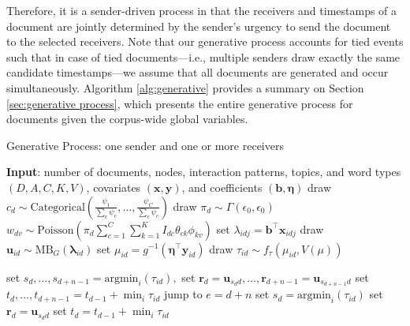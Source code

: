 \documentclass[ba]{imsart}
\def\spacingset#1{\renewcommand{\baselinestretch}%
	{#1}\small\normalsize} \spacingset{1}
\numberwithin{equation}{section}
\theoremstyle{plain}
\begin{document}
		Therefore, it is a sender-driven process in that the receivers and timestamps of a document are jointly determined by the sender's urgency to send the document to the selected receivers. Note that our generative process accounts for tied events such that in case of tied documents---i.e., multiple senders draw exactly the same candidate timestamps---we assume that all documents are generated and occur simultaneously. Algorithm \ref{alg:generative} provides a summary on Section \ref{sec:generative process}, which presents the entire generative process for documents given the corpus-wide global variables.
	\begin{algorithm}[!t]
		\spacingset{1}
		\SetAlgoLined
		\caption{Generative Process: one sender and one or more receivers}
	\begin{algorithmic}
		\STATE \textbf{Input}: number of documents, nodes, interaction patterns, topics, and word types $(D, A, C, K, V)$, covariates $(\boldsymbol{x}, \boldsymbol{y})$, and coefficients $(\boldsymbol{b}, \boldsymbol{\eta})$
		\vskip 0.1in
		\STATE	draw $c_d\sim \mbox{Categorical}(\frac{\psi_1}{\sum_c \psi_c},\ldots,\frac{\psi_C}{\sum_c\psi_c})$
		\STATE draw $\pi_{d}\sim \Gamma(\epsilon_0,\epsilon_0)$
		\STATE $w_{dv} \sim \mbox{Poisson}(\pi_{d}\sum_{c=1}^C \sum_{k=1}^K I_{dc} \theta_{ck}\phi_{kv})$
			\ENDFOR
		\STATE	set $\lambda_{idj} = {\boldsymbol{b}}^{\top}\boldsymbol{x}_{idj}$
		\ENDFOR
		\STATE	draw $\boldsymbol{u}_{id}  \sim
		\mbox{MB}_G(\boldsymbol{\lambda}_{id})$
		\STATE		set $\mu_{id} = g^{-1}(\boldsymbol{\eta}^\top \boldsymbol{y}_{id})$
		\STATE		draw $\tau_{id} \sim f_\tau(\mu_{id}, V(\mu))$
		\ENDFOR
		
		\STATE	set $s_d,\ldots, s_{d+n-1}=\mbox{argmin}_{i}(\tau_{id}),$
		\STATE	set $\boldsymbol{r}_d=\boldsymbol{u}_{s_d d},\ldots,\boldsymbol{r}_{d+n-1}=\boldsymbol{u}_{s_{d+n-1} d}$
		\STATE	set $t_d, \ldots, t_{d+n-1}=t_{d-1} + \min_i\tau_{id}$
		\STATE		jump to $e = d+n$
		\ELSE
		\STATE	set $s_d= \mbox{argmin}_{i}(\tau_{id})$
		\STATE		set $\boldsymbol{r}_d= \boldsymbol{u}_{s_d d}$
		\STATE	set $t_d =t_{d-1} + \min_i\tau_{id}$
		\ENDIF
		\ENDFOR
	\end{algorithmic}
		\label{alg:generative}
	\end{algorithm}
	\newpage
\end{document}
